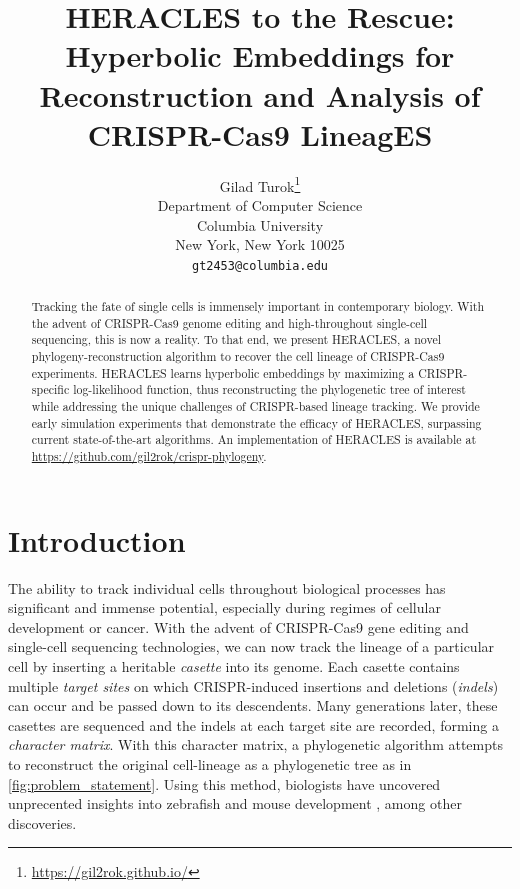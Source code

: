 \documentclass{article}
\title{HERACLES to the Rescue: Hyperbolic Embeddings for Reconstruction and Analysis of CRISPR-Cas9 LineagES}
\author{%
  Gilad Turok\thanks{\url{https://gil2rok.github.io/}} \\
  Department of Computer Science\\
  Columbia University\\
  New York, New York 10025 \\
  \texttt{gt2453@columbia.edu} \\
}
\begin{document}
\maketitle


\begin{abstract}
  Tracking the fate of single cells is immensely important in contemporary biology. With the advent of CRISPR-Cas9 genome editing and high-throughout single-cell sequencing, this is now a reality. To that end, we present HERACLES, a novel phylogeny-reconstruction algorithm to recover the cell lineage of CRISPR-Cas9  experiments. HERACLES learns hyperbolic embeddings by maximizing a CRISPR-specific log-likelihood function, thus reconstructing the phylogenetic tree of interest while addressing the unique challenges of CRISPR-based lineage tracking. We provide early simulation experiments that demonstrate the efficacy of HERACLES, surpassing  current state-of-the-art algorithms. An implementation of HERACLES is available at \url{https://github.com/gil2rok/crispr-phylogeny}.
\end{abstract}


\section{Introduction}


The ability to track individual cells throughout biological processes has significant and immense potential, especially during regimes of cellular development or cancer. With the advent of CRISPR-Cas9 gene editing and single-cell sequencing technologies, we can now track the lineage of a particular cell by inserting a heritable \emph{casette} into its genome. Each casette contains multiple \emph{target sites} on which CRISPR-induced insertions and deletions (\emph{indels}) can occur and be passed down to its descendents. Many generations later, these casettes are sequenced and the indels at each target site are recorded, forming a \emph{character matrix}. With this character matrix, a phylogenetic algorithm attempts to reconstruct the original cell-lineage as a phylogenetic tree as in \ref{fig:problem_statement}. Using this method, biologists have uncovered unprecented insights into zebrafish \cite{McKenna2016} \cite{Raj2018}  and mouse development \cite{Kalhor2018} \cite{chan2019}, among other discoveries.
\end{document}
